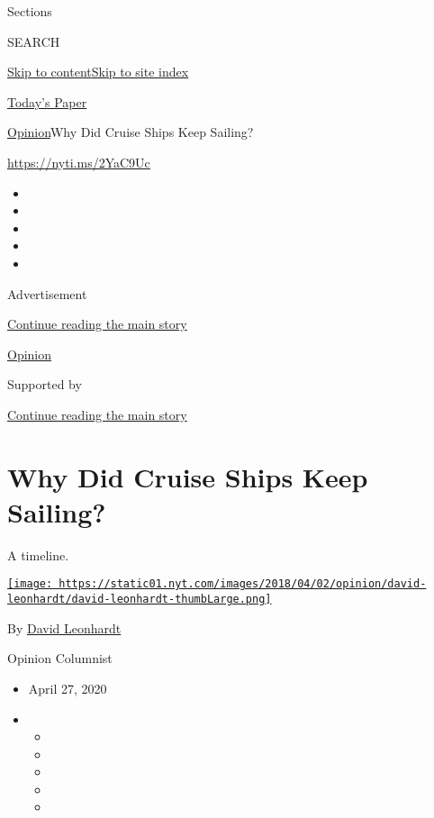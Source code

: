 Sections

SEARCH

\protect\hyperlink{site-content}{Skip to
content}\protect\hyperlink{site-index}{Skip to site index}

\href{https://myaccount.nytimes.com/auth/login?response_type=cookie\&client_id=vi}{}

\href{https://www.nytimes.com/section/todayspaper}{Today's Paper}

\href{/section/opinion}{Opinion}\textbar{}Why Did Cruise Ships Keep
Sailing?

\href{https://nyti.ms/2YaC9Uc}{https://nyti.ms/2YaC9Uc}

\begin{itemize}
\item
\item
\item
\item
\item
\end{itemize}

Advertisement

\protect\hyperlink{after-top}{Continue reading the main story}

\href{/section/opinion}{Opinion}

Supported by

\protect\hyperlink{after-sponsor}{Continue reading the main story}

\hypertarget{why-did-cruise-ships-keep-sailing}{%
\section{Why Did Cruise Ships Keep
Sailing?}\label{why-did-cruise-ships-keep-sailing}}

A timeline.

\href{https://www.nytimes.com/by/david-leonhardt}{\texttt{[image: https://static01.nyt.com/images/2018/04/02/opinion/david-leonhardt/david-leonhardt-thumbLarge.png]}}

By \href{https://www.nytimes.com/by/david-leonhardt}{David Leonhardt}

Opinion Columnist

\begin{itemize}
\item
  April 27, 2020
\item
  \begin{itemize}
  \item
  \item
  \item
  \item
  \item
  \end{itemize}
\end{itemize}

